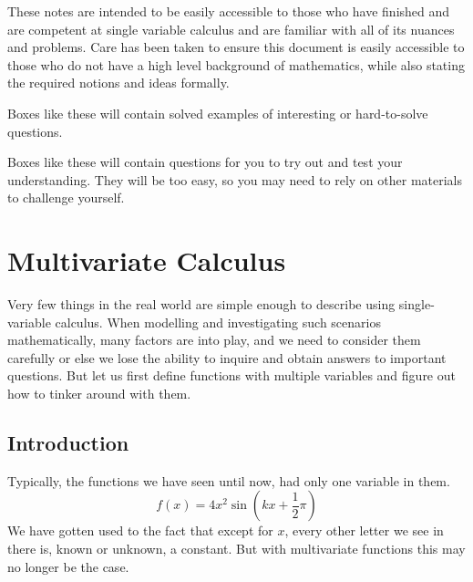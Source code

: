 \documentclass[14pt]{article}
\begin{document}
	These notes are intended to be easily accessible to those who have finished and are competent at single variable calculus and are familiar with all of its nuances and problems. Care has been taken to ensure this document is easily accessible to those who do not have a high level background of mathematics, while also stating the required notions and ideas formally.
	\begin{example*}{}{}
		Boxes like these will contain solved examples of interesting or hard-to-solve questions.
	\end{example*}
	\begin{question*}{}{}
		Boxes like these will contain questions for you to try out and test your understanding. They will be too easy, so you may need to rely on other materials to challenge yourself.
		
		\raggedleft {}
		
	\end{question*}
	\pagebreak
	
	\section{Multivariate Calculus}
	Very few things in the real world are simple enough to describe using single-variable calculus. When modelling and investigating such scenarios mathematically, many factors are into play, and we need to consider them carefully or else we lose the ability to inquire and obtain answers to important questions. But let us first define functions with multiple variables and figure out how to tinker around with them.
	
	\subsection{Introduction}
	Typically, the functions we have seen until now, had only one variable in them.
	\begin{equation*}
		f(x) = 4x^2\sin\left( kx + \frac{1}{2}\pi\right) 
	\end{equation*}
	We have gotten used to the fact that except for $x$, every other letter we see in there is, known or unknown, a constant. But with multivariate functions this may no longer be the case.
	
\end{document}
